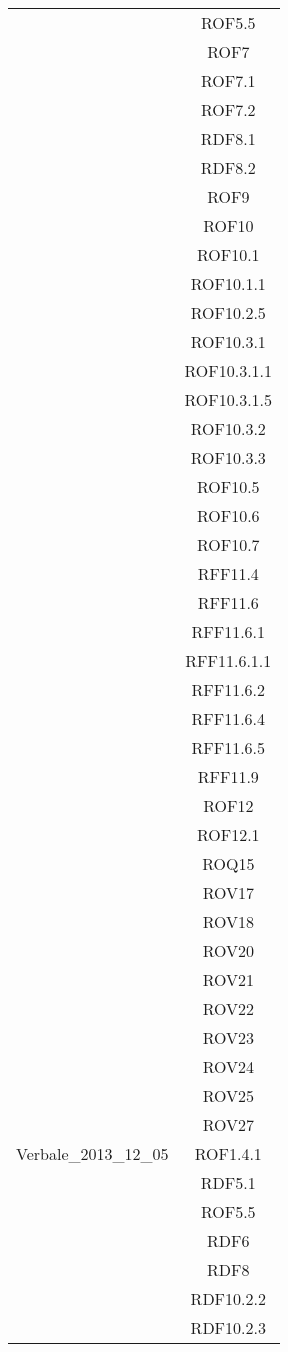 \begin{longtable}{|c|c|}
& ROF5.5\\
& ROF7\\
& ROF7.1\\
& ROF7.2\\
& RDF8.1\\
& RDF8.2\\
& ROF9\\
& ROF10\\
& ROF10.1\\
& ROF10.1.1\\
& ROF10.2.5\\
& ROF10.3.1\\
& ROF10.3.1.1\\
& ROF10.3.1.5\\
& ROF10.3.2\\
& ROF10.3.3\\
& ROF10.5\\
& ROF10.6\\
& ROF10.7\\
& RFF11.4\\
& RFF11.6\\
& RFF11.6.1\\
& RFF11.6.1.1\\
& RFF11.6.2\\
& RFF11.6.4\\
& RFF11.6.5\\
& RFF11.9\\
& ROF12\\
& ROF12.1\\
& ROQ15\\
& ROV17\\
& ROV18\\
& ROV20\\
& ROV21\\
& ROV22\\
& ROV23\\
& ROV24\\
& ROV25\\
& ROV27\\


\midrule
Verbale\_2013\_12\_05
& ROF1.4.1\\
& RDF5.1\\
& ROF5.5\\
& RDF6\\
& RDF8\\
& RDF10.2.2\\
& RDF10.2.3\\


\end{longtable}
